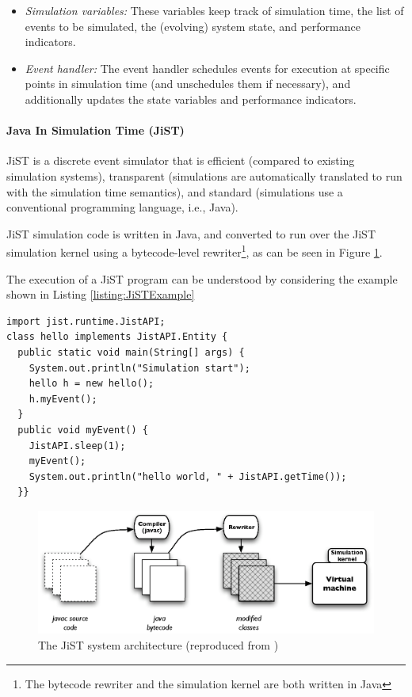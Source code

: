 \begin{itemize}
  \item \emph{Simulation variables:} These variables keep track of simulation 
  time, the list of events to be simulated, the (evolving) system state, and 
  performance indicators.
  \item \emph{Event handler:} The event handler schedules events for execution 
  at specific points in simulation time (and unschedules them if necessary), 
  and additionally updates the state variables and performance indicators.
\end{itemize}
 
\paragraph{Java In Simulation Time (JiST)} \label{subsec:jist}

JiST \cite{barr_JIST:2005} is a discrete event simulator that is 
efficient (compared to existing simulation systems), 
transparent (simulations are automatically translated to run with the 
simulation time semantics), and standard (simulations use a
conventional programming language, i.e., Java).

JiST simulation code is written in Java, and converted to run over the JiST 
simulation kernel using a bytecode-level rewriter\footnote{The bytecode 
rewriter and the simulation kernel are both written in Java},  as can be
seen in Figure \ref{Fig:JiST_architecture}.

The execution of a JiST program can be understood by considering the example 
shown in Listing \ref{listing:JiSTExample}

\begin{lstlisting}[frame=trbl, basewidth={0.55em, 0.6em}, captionpos=b, 
basicstyle=\ttfamily\footnotesize, breaklines, caption = Example JiST program (reproduced from \cite{barr_JIST:2005}, label = listing:JiSTExample]  
import jist.runtime.JistAPI;  
class hello implements JistAPI.Entity { 
  public static void main(String[] args) { 
    System.out.println("Simulation start"); 
    hello h = new hello(); 
    h.myEvent(); 
  } 
  public void myEvent() { 
    JistAPI.sleep(1); 
    myEvent(); 
    System.out.println("hello world, " + JistAPI.getTime()); 
  }} 
\end{lstlisting}

\begin{figure}
\centering
\includegraphics[width=\textwidth]{img/JiST_architecture.eps} 
\caption[The JiST System Architecture]{The JiST system architecture (reproduced from
\cite{barr_JIST:2005})}
\label{Fig:JiST_architecture}
\end{figure}  
 
